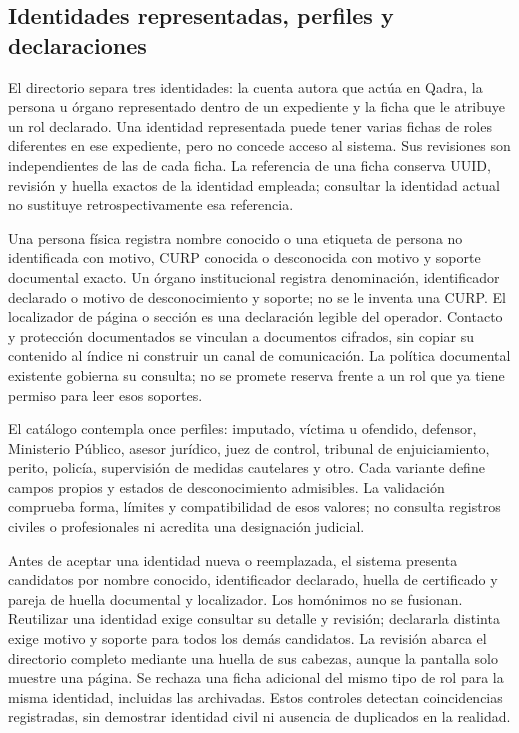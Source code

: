 \subsection{Identidades representadas, perfiles y declaraciones}\label{sec:diseno-participantes-tipificados}

El directorio separa tres identidades: la cuenta autora que actúa en Qadra, la persona u órgano representado dentro de un expediente y la ficha que le atribuye un rol declarado. Una identidad representada puede tener varias fichas de roles diferentes en ese expediente, pero no concede acceso al sistema. Sus revisiones son independientes de las de cada ficha. La referencia de una ficha conserva UUID, revisión y huella exactos de la identidad empleada; consultar la identidad actual no sustituye retrospectivamente esa referencia.

Una persona física registra nombre conocido o una etiqueta de persona no identificada con motivo, CURP conocida o desconocida con motivo y soporte documental exacto. Un órgano institucional registra denominación, identificador declarado o motivo de desconocimiento y soporte; no se le inventa una CURP. El localizador de página o sección es una declaración legible del operador. Contacto y protección documentados se vinculan a documentos cifrados, sin copiar su contenido al índice ni construir un canal de comunicación. La política documental existente gobierna su consulta; no se promete reserva frente a un rol que ya tiene permiso para leer esos soportes.

El catálogo contempla once perfiles: imputado, víctima u ofendido, defensor, Ministerio Público, asesor jurídico, juez de control, tribunal de enjuiciamiento, perito, policía, supervisión de medidas cautelares y otro. Cada variante define campos propios y estados de desconocimiento admisibles. La validación comprueba forma, límites y compatibilidad de esos valores; no consulta registros civiles o profesionales ni acredita una designación judicial.

Antes de aceptar una identidad nueva o reemplazada, el sistema presenta candidatos por nombre conocido, identificador declarado, huella de certificado y pareja de huella documental y localizador. Los homónimos no se fusionan. Reutilizar una identidad exige consultar su detalle y revisión; declararla distinta exige motivo y soporte para todos los demás candidatos. La revisión abarca el directorio completo mediante una huella de sus cabezas, aunque la pantalla solo muestre una página. Se rechaza una ficha adicional del mismo tipo de rol para la misma identidad, incluidas las archivadas. Estos controles detectan coincidencias registradas, sin demostrar identidad civil ni ausencia de duplicados en la realidad.

